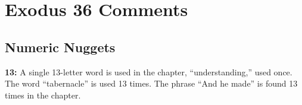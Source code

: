 \section{Exodus 36 Comments}

\subsection{Numeric Nuggets}
\textbf{13: } A single 13-letter word is used in the chapter, ``understanding,'' used once. The word ``tabernacle'' is used 13 times. The phrase ``And he made'' is found 13 times in the chapter.

